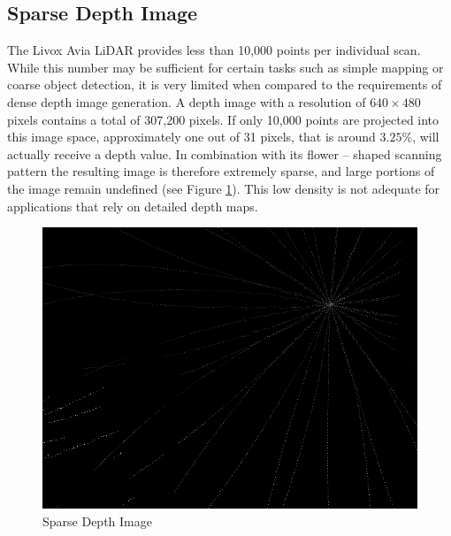 \documentclass[english, bachelor, utf8]{base/thesis_telematics}
\begin{document}
\subsection*{Sparse Depth Image}
\label{sec:sparsedepth}
The Livox Avia LiDAR provides less than 10,000 points per individual scan.
While this number may be sufficient for certain tasks such as simple mapping or coarse object detection, 
it is very limited when compared to the requirements of dense depth image generation. 
A depth image with a resolution of $640 \times 480$ pixels contains a total of 307,200 pixels.
If only 10,000 points are projected into this image space, approximately one out of 31 pixels,
that is around $3.25\%$, will actually receive a depth value.
In combination with its flower -- shaped scanning pattern
the resulting image is therefore extremely sparse, and large portions of the image remain undefined (see Figure \ref{fig:sparse_depth}). 
This low density is not adequate for applications that rely on detailed depth maps.

\begin{figure}[ht!]
    \centering
    \includegraphics[width=\linewidth]{pics/depth_no_icp_robohall.png}
    \caption{Sparse Depth Image}
    \label{fig:sparse_depth}
\end{figure}
\end{document}
